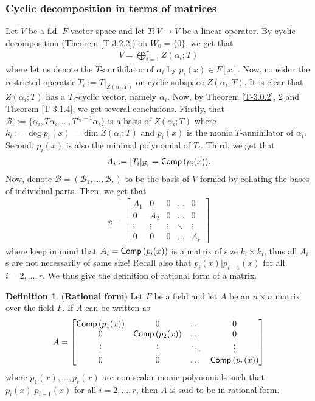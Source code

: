 \documentclass[letterpaper,11pt,twoside]{article}
\theoremstyle{definition}
\theoremstyle{definition}
\newtheorem{definition}[proposition]{Definition}
\theoremstyle{definition}
\theoremstyle{definition}
\theoremstyle{definition}
\theoremstyle{definition}
\theoremstyle{remark}
\theoremstyle{definition}
\newcommand{\rest}[2]{\left. { #1 }\right \vert_{#2}}
\newcommand{\Comp}[1]{{\fontfamily{lmss}\selectfont 
            \text{Comp}\left(#1\right)
}}
\begin{document}
	\subsubsection{Cyclic decomposition in terms of matrices}
	Let $ V $ be a f.d. $ F $-vector space and let $ T: V\to V $ be a linear operator. By cyclic decomposition (Theorem \ref{T-3.2.2}) on $ W_0 =\{0\} $, we get that 
	\begin{align*}
		V = \bigoplus_{i=1}^{r}Z(\alpha_i;T)
	\end{align*}
	where let us denote the $ T $-annihilator of $ \alpha_i $ by $ p_i(x) \in F[x]$. Now, consider the restricted operator $ T_i := \rest{T}{Z(\alpha_i;T)} $ on cyclic subspace $ Z(\alpha_i;T) $. It is clear that $ Z(\alpha_i;T) $ has a $ T_i $-cyclic vector, namely $ \alpha_i $. Now, by Theorem \ref{T-3.0.2}, 2 and Theorem \ref{T-3.1.4}, we get several conclusions. Firstly, that $\mathcal{B}_{i}:= \{\alpha_i,T\alpha_i,\dots, T^{k_i-1}\alpha_i\} $ is a basis of $ Z(\alpha_i;T) $ where $ k_i := \deg p_{i}(x) = \dim Z(\alpha_i;T) $ and $ p_{i}(x) $ is the monic $ T $-annihilator of $ \alpha_{i} $. Second, $ p_{i}(x) $ is also the minimal polynomial of $ T_i $. Third, we get that 
	\begin{align*}
		A_i := [T_i]_{\mathcal{B}_i} = \Comp{p_{i}(x)}.
	\end{align*}
    Now, denote $ \mathcal{B} = (\mathcal{B}_1,\dots, \mathcal{B}_{r}) $ to be the basis of $ V $ formed by collating the bases of individual parts. Then, we get that
    \begin{align*}
    	[T]_{\mathcal{B}} = \begin{bmatrix}
    		A_1 &0 & 0 &\dots &0\\
    		0& A_2 & 0 & \dots &0\\
    		\vdots & \vdots & \vdots & \ddots & \vdots\\
    		0 & 0  & 0 & \dots & A_r
    	\end{bmatrix}
    \end{align*}
	where keep in mind that $ A_i = \Comp{p_i(x)} $ is a matrix of size $ k_i\times k_i $, thus all $ A_i $s are not necessarily of same size! Recall also that $ p_i(x) | p_{i-1}(x) $ for all $ i=2,\dots, r $. We thus give the definition of rational form of a matrix.
	\begin{definition}
		(\textbf{Rational form}) Let $ F $ be a field and let $ A $ be an $ n\times n $ matrix over the field $ F $. If $ A $ can be written as 
		\begin{align*}
			A= \begin{bmatrix}
				\Comp{p_1(x)} & 0 & \dots & 0\\
				0 & \Comp{p_2(x)} & \dots & 0\\
				\vdots & \vdots & \ddots & \vdots \\
				0 & 0 & \dots & \Comp{p_r(x)}
			\end{bmatrix}
		\end{align*} 
		where $ p_1(x), \dots, p_r(x)$ are non-scalar monic polynomials such that $ p_i(x) | p_{i-1}(x)$ for all $ i=2,\dots, r $, then $ A $ is said to be in rational form.
	\end{definition}
\end{document}
